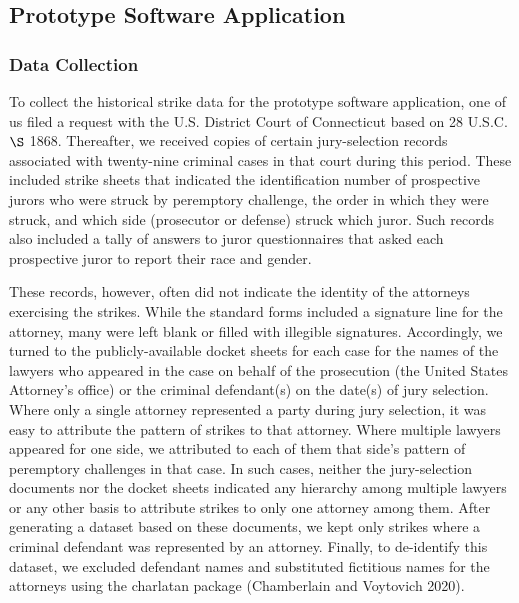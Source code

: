 \documentclass[12pt]{article}
\begin{document}
\hypertarget{prototype-software-application}{%
\subsection{Prototype Software Application}\label{prototype-software-application}}

\hypertarget{data-collection}{%
\subsubsection{Data Collection}\label{data-collection}}

To collect the historical strike data for the prototype software application, one of us filed a request with the U.S. District Court of Connecticut based on 28 U.S.C. \(\S\) 1868. Thereafter, we received copies of certain jury-selection records associated with twenty-nine criminal cases in that court during this period. These included strike sheets that indicated the identification number of prospective jurors who were struck by peremptory challenge, the order in which they were struck, and which side (prosecutor or defense) struck which juror. Such records also included a tally of answers to juror questionnaires that asked each prospective juror to report their race and gender.

These records, however, often did not indicate the identity of the attorneys exercising the strikes. While the standard forms included a signature line for the attorney, many were left blank or filled with illegible signatures. Accordingly, we turned to the publicly-available docket sheets for each case for the names of the lawyers who appeared in the case on behalf of the prosecution (the United States Attorney's office) or the criminal defendant(s) on the date(s) of jury selection. Where only a single attorney represented a party during jury selection, it was easy to attribute the pattern of strikes to that attorney. Where multiple lawyers appeared for one side, we attributed to each of them that side's pattern of peremptory challenges in that case. In such cases, neither the jury-selection documents nor the docket sheets indicated any hierarchy among multiple lawyers or any other basis to attribute strikes to only one attorney among them. After generating a dataset based on these documents, we kept only strikes where a criminal defendant was represented by an attorney. Finally, to de-identify this dataset, we excluded defendant names and substituted fictitious names for the attorneys using the charlatan package (Chamberlain and Voytovich 2020).
\end{document}
